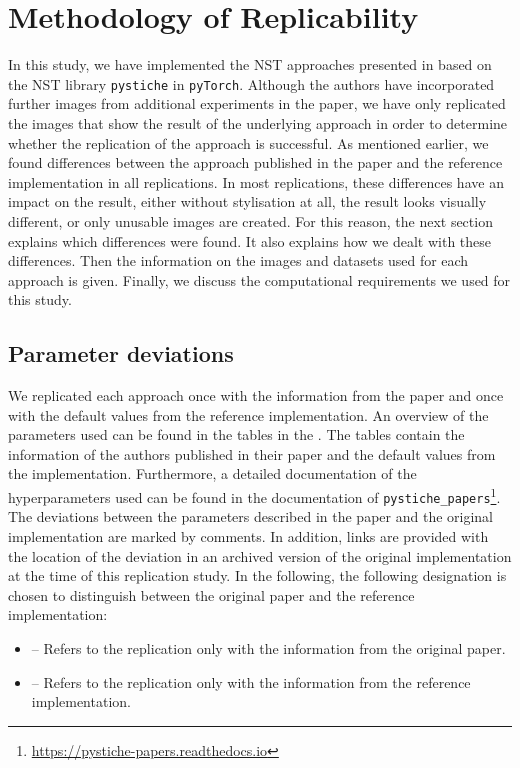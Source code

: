\section{Methodology of Replicability}

In this study, we have implemented the \gls{NST} approaches presented in  based on the \gls{NST} library \texttt{pystiche} \cite{ML2020} in \texttt{pyTorch}. Although the authors have incorporated further images from additional experiments in the paper, we have only replicated the images that show the result of the underlying approach in order to determine whether the replication of the approach is successful. As mentioned earlier, we found differences between the approach published in the paper and the reference implementation in all replications. In most replications, these differences have an impact on the result, either without stylisation at all, the result looks visually different, or only unusable images are created. For this reason, the next section explains which differences were found. It also explains how we dealt with these differences. Then the information on the images and datasets used for each approach is given. Finally, we discuss the computational requirements we used for this study. 

\subsection{Parameter deviations} \label{sec:replicability}
We replicated each approach once with the information from the paper and once with the default values from the reference implementation. An overview of the parameters used can be found in the tables in the . The tables contain the information of the authors published in their paper and the default values from the implementation. Furthermore, a detailed documentation of the hyperparameters used can be found in the documentation of \texttt{pystiche\_papers}\footnote{\url{https://pystiche-papers.readthedocs.io}}. The deviations between the parameters described in the paper and the original implementation are marked by comments. In addition, links are provided with the location of the deviation in an archived version of the original implementation at the time of this replication study. In the following, the following designation is chosen to distinguish between the original paper and the reference implementation: 
\begin{itemize}
	\item \paper{} -- Refers to the replication only with the information from the original paper. 
	\item \implementation{} -- Refers to the replication only with the information from the reference implementation. 
\end{itemize}

